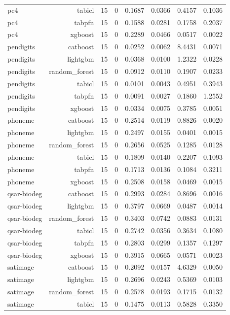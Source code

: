 \begin{table}[htbp]
\begin{tabular}{lrrrrrrr}
pc4 & tabicl & 15 & 0 & 0.1687 & 0.0366 & 0.4157 & 0.1036 \\
pc4 & tabpfn & 15 & 0 & 0.1588 & 0.0281 & 0.1758 & 0.2037 \\
pc4 & xgboost & 15 & 0 & 0.2289 & 0.0466 & 0.0517 & 0.0022 \\
pendigits & catboost & 15 & 0 & 0.0252 & 0.0062 & 8.4431 & 0.0071 \\
pendigits & lightgbm & 15 & 0 & 0.0368 & 0.0100 & 1.2322 & 0.0228 \\
pendigits & random\_forest & 15 & 0 & 0.0912 & 0.0110 & 0.1907 & 0.0233 \\
pendigits & tabicl & 15 & 0 & 0.0101 & 0.0043 & 0.4951 & 0.3943 \\
pendigits & tabpfn & 15 & 0 & 0.0091 & 0.0027 & 0.1860 & 1.2552 \\
pendigits & xgboost & 15 & 0 & 0.0334 & 0.0075 & 0.3785 & 0.0051 \\
phoneme & catboost & 15 & 0 & 0.2514 & 0.0119 & 0.8826 & 0.0020 \\
phoneme & lightgbm & 15 & 0 & 0.2497 & 0.0155 & 0.0401 & 0.0015 \\
phoneme & random\_forest & 15 & 0 & 0.2656 & 0.0525 & 0.1285 & 0.0128 \\
phoneme & tabicl & 15 & 0 & 0.1809 & 0.0140 & 0.2207 & 0.1093 \\
phoneme & tabpfn & 15 & 0 & 0.1713 & 0.0136 & 0.1084 & 0.3211 \\
phoneme & xgboost & 15 & 0 & 0.2508 & 0.0158 & 0.0469 & 0.0015 \\
qsar-biodeg & catboost & 15 & 0 & 0.2993 & 0.0284 & 0.8696 & 0.0016 \\
qsar-biodeg & lightgbm & 15 & 0 & 0.3797 & 0.0669 & 0.0487 & 0.0014 \\
qsar-biodeg & random\_forest & 15 & 0 & 0.3403 & 0.0742 & 0.0883 & 0.0131 \\
qsar-biodeg & tabicl & 15 & 0 & 0.2742 & 0.0356 & 0.3634 & 0.1080 \\
qsar-biodeg & tabpfn & 15 & 0 & 0.2803 & 0.0299 & 0.1357 & 0.1297 \\
qsar-biodeg & xgboost & 15 & 0 & 0.3915 & 0.0665 & 0.0571 & 0.0023 \\
satimage & catboost & 15 & 0 & 0.2092 & 0.0157 & 4.6329 & 0.0050 \\
satimage & lightgbm & 15 & 0 & 0.2696 & 0.0243 & 0.5369 & 0.0103 \\
satimage & random\_forest & 15 & 0 & 0.2578 & 0.0193 & 0.1715 & 0.0132 \\
satimage & tabicl & 15 & 0 & 0.1475 & 0.0113 & 0.5828 & 0.3350 \\

\end{tabular}
\end{table}
